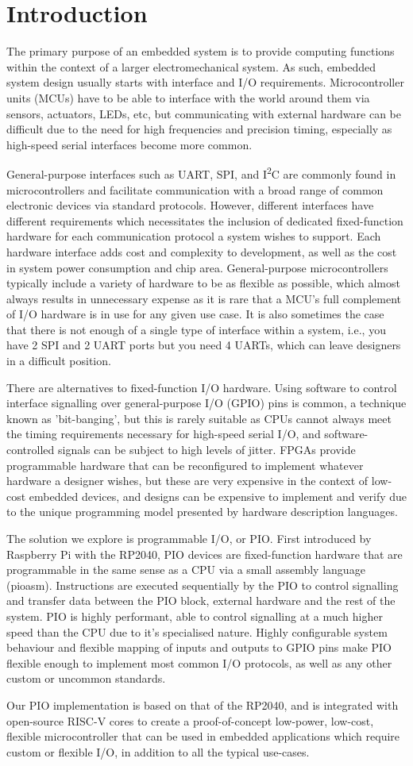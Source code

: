 \chapter{Introduction}
\label{ch:introduction}

The primary purpose of an embedded system is to provide computing functions within the context of a larger electromechanical system. As such, embedded system design usually starts with interface and I/O requirements. Microcontroller units (MCUs) have to be able to interface with the world around them via sensors, actuators, LEDs, etc, but communicating with external hardware can be difficult due to the need for high frequencies and precision timing, especially as high-speed serial interfaces become more common.

General-purpose interfaces such as UART, SPI, and I\textsuperscript{2}C are commonly found in microcontrollers and facilitate communication with a broad range of common electronic devices via standard protocols. However, different interfaces have different requirements which necessitates the inclusion of dedicated fixed-function hardware for each communication protocol a system wishes to support. Each hardware interface adds cost and complexity to development, as well as the cost in system power consumption and chip area. General-purpose microcontrollers typically include a variety of hardware to be as flexible as possible, which almost always results in unnecessary expense as it is rare that a MCU's full complement of I/O hardware is in use for any given use case. It is also sometimes the case that there is not enough of a single type of interface within a system, i.e., you have 2 SPI and 2 UART ports but you need 4 UARTs, which can leave designers in a difficult position.

There are alternatives to fixed-function I/O hardware. Using software to control interface signalling over general-purpose I/O (GPIO) pins is common, a technique known as 'bit-banging', but this is rarely suitable as CPUs cannot always meet the timing requirements necessary for high-speed serial I/O, and software-controlled signals can be subject to high levels of jitter. FPGAs provide programmable hardware that can be reconfigured to implement whatever hardware a designer wishes, but these are very expensive in the context of low-cost embedded devices, and designs can be expensive to implement and verify due to the unique programming model presented by hardware description languages.

The solution we explore is programmable I/O, or PIO. First introduced by Raspberry Pi with the RP2040, PIO devices are fixed-function hardware that are programmable in the same sense as a CPU via a small assembly language (pioasm). Instructions are executed sequentially by the PIO to control signalling and transfer data between the PIO block, external hardware and the rest of the system. PIO is highly performant, able to control signalling at a much higher speed than the CPU due to it's specialised nature. Highly configurable system behaviour and flexible mapping of inputs and outputs to GPIO pins make PIO flexible enough to implement most common I/O protocols, as well as any other custom or uncommon standards.

Our PIO implementation is based on that of the RP2040, and is integrated with open-source RISC-V cores to create a proof-of-concept low-power, low-cost, flexible microcontroller that can be used in embedded applications which require custom or flexible I/O, in addition to all the typical use-cases.